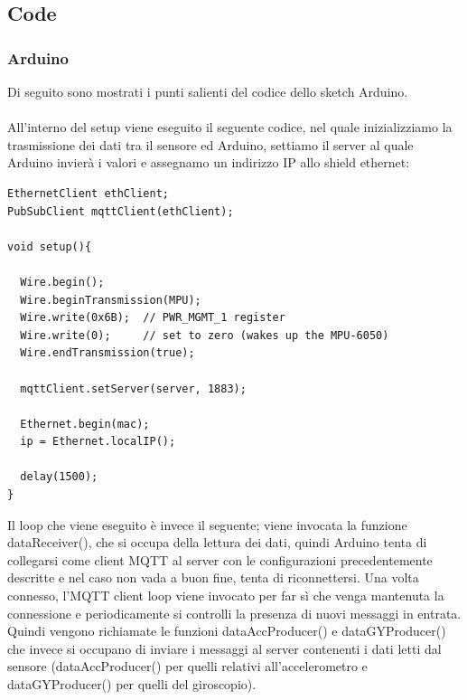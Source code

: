 \documentclass[]{scrartcl}
\begin{document}
\subsection{Code}

\subsubsection{Arduino}

Di seguito sono mostrati i punti salienti del codice dello sketch Arduino.\\\\
All'interno del setup viene eseguito il seguente codice, nel quale inizializziamo la trasmissione dei dati tra il sensore ed Arduino, settiamo il server al quale Arduino invierà i valori e assegnamo un indirizzo IP allo shield ethernet: \\

\begingroup
\fontsize{9.5pt}{8pt}\selectfont
\begin{lstlisting}[frame=single]
EthernetClient ethClient;
PubSubClient mqttClient(ethClient);

void setup(){

  Wire.begin();
  Wire.beginTransmission(MPU);
  Wire.write(0x6B);  // PWR_MGMT_1 register
  Wire.write(0);     // set to zero (wakes up the MPU-6050)
  Wire.endTransmission(true);

  mqttClient.setServer(server, 1883);

  Ethernet.begin(mac);
  ip = Ethernet.localIP();

  delay(1500);
}
\end{lstlisting}
\endgroup

Il loop che viene eseguito è invece il seguente; viene invocata la funzione dataReceiver(), che si occupa della lettura dei dati, quindi Arduino tenta di collegarsi come client MQTT al server con le configurazioni precedentemente descritte e nel caso non vada a buon fine, tenta di riconnettersi. Una volta connesso, l'MQTT client loop viene invocato per far sì che venga mantenuta la connessione e periodicamente si controlli la presenza di nuovi messaggi in entrata. Quindi vengono richiamate le funzioni dataAccProducer() e dataGYProducer() che invece si occupano di inviare i messaggi al server contenenti i dati letti dal sensore (dataAccProducer() per quelli relativi all'accelerometro e dataGYProducer() per quelli del giroscopio).
\end{document}

